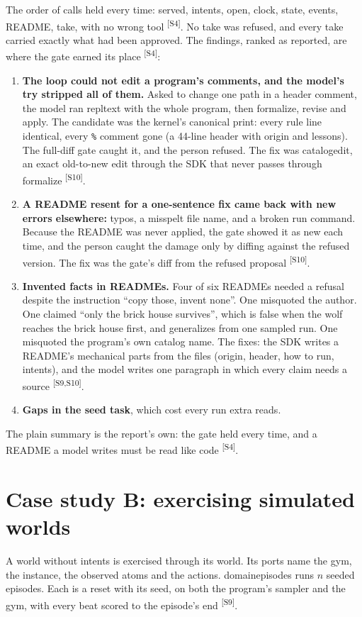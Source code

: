 \documentclass[11pt]{article}
\newcommand{\tool}[1]{{\ttfamily\begingroup\def\_{\textunderscore\allowbreak}#1\endgroup}}
\newcommand{\src}[1]{\textsuperscript{[#1]}}
\begin{document}
The order of calls held every time: served, intents, open, clock, state,
events, README, take, with no wrong tool \src{S4}. No take was refused,
and every take carried exactly what had been approved. The findings, ranked
as reported, are where the gate earned its place \src{S4}:
\begin{enumerate}[nosep]
\item \textbf{The loop could not edit a program's comments, and the
  model's try stripped all of them.} Asked to change one path in a header
  comment, the model ran \tool{repl\_text} with the whole program, then
  formalize, revise and apply. The candidate was the kernel's canonical
  print: every rule line identical, every \texttt{\%} comment gone (a
  44-line header with origin and lessons). The full-diff gate caught it,
  and the person refused. The fix was \tool{catalog\_edit}, an exact
  old-to-new edit through the SDK that never passes through formalize
  \src{S10}.
\item \textbf{A README resent for a one-sentence fix came back with new
  errors elsewhere:} typos, a misspelt file name, and a broken run command.
  Because the README was never applied, the gate showed it as new each
  time, and the person caught the damage only by diffing against the
  refused version. The fix was the gate's diff from the refused proposal
  \src{S10}.
\item \textbf{Invented facts in READMEs.} Four of six READMEs needed a
  refusal despite the instruction ``copy those, invent none''. One
  misquoted the author. One claimed ``only the brick house survives'',
  which is false when the wolf reaches the brick house first, and
  generalizes from one sampled run. One misquoted the program's own
  catalog name. The fixes: the SDK writes a README's mechanical parts from
  the files (origin, header, how to run, intents), and the model writes one
  paragraph in which every claim needs a source \src{S9,S10}.
\item \textbf{Gaps in the seed task}, which cost every run extra reads.
\end{enumerate}
The plain summary is the report's own: the gate held every time, and a
README a model writes must be read like code \src{S4}.

\section{Case study B: exercising simulated worlds}\label{sec:rddl}

A world without intents is exercised through its world. Its ports name
the gym, the instance, the observed atoms and the actions.
\tool{domain\_episodes} runs $n$ seeded episodes. Each is a reset with its
seed, on both the program's sampler and the gym, with every beat scored to
the episode's end \src{S9}.
\end{document}
